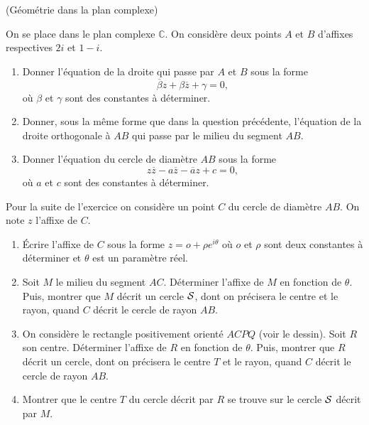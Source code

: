 \documentclass[a4paper,12pt,reqno]{amsart}
\begin{document}
\begin{exo} (Géométrie dans la plan complexe)

  On se place dans le plan complexe $\mathbb{C}$. On considère deux points $A$ et $B$ d'affixes respectives $2i$ et $1-i$.

  \begin{enumerate}
    \item Donner l'équation de la droite qui passe par $A$ et $B$ sous la forme
    $$
      \overline{\beta}z+\beta\overline{z}+\gamma=0,
    $$
    où $\beta$ et $\gamma$ sont des constantes à déterminer.
    \item Donner, sous la même forme que dans la question précédente, l'équation de la droite orthogonale à $AB$ qui passe par le milieu du segment $AB$.
    \item Donner l'équation du cercle de diamètre $AB$ sous la forme
      $$
        z\overline{z}-a\overline{z}-\overline{a}z+c=0,
      $$
      où $a$ et $c$ sont des constantes à déterminer.
  \end{enumerate}

  \vspace{4mm}
  Pour la suite de l'exercice on considère un point $C$ du cercle de diamètre $AB$. On note $z$ l'affixe de $C$.\\
  \vspace{-11mm}

  \begin{enumerate}[resume]
    \item Écrire l'affixe de $C$ sous la forme $z = o + \rho e^{i\theta}$ où $o$ et $\rho$ sont deux constantes à déterminer et $\theta$ est un paramètre réel.
    \item Soit $M$ le milieu du segment $AC$. Déterminer l'affixe de $M$ en fonction de $\theta$. Puis, montrer que $M$ décrit un cercle $\mathcal{S}$, dont on précisera le centre et le rayon, quand $C$ décrit le cercle de rayon $AB$.
    \item On considère le rectangle positivement orienté $ACPQ$ (voir le dessin). Soit $R$ son centre. Déterminer l'affixe de $R$ en fonction de $\theta$. Puis, montrer que $R$ décrit un cercle, dont on précisera le centre $T$ et le rayon, quand $C$ décrit le cercle de rayon $AB$.
    \item Montrer que le centre $T$ du cercle décrit par $R$ se trouve sur le cercle $\mathcal{S}$ décrit par $M$.
  \end{enumerate}

\end{exo}
\end{document}
